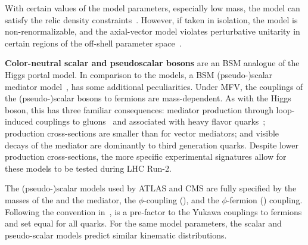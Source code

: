 With certain values of the model parameters, especially low \Zprime mass,
the model can satisfy the relic density constraints~\cite{Chala:2015ama}.
However, if taken in isolation, the model is non-renormalizable, and the axial-vector
model violates perturbative unitarity in certain regions of the off-shell parameter space~\cite{Chala:2015ama,Kahlhoefer:2015bea,Boveia:2016mrp}. 



\textbf{Color-neutral scalar and pseudoscalar bosons} are an BSM analogue of the Higgs portal model. In comparison to the \Zprime models, a BSM (pseudo-)scalar mediator model~\cite{Buckley:2014fba},  
has some additional peculiarities. 
Under MFV, the couplings of the (pseudo-)scalar bosons to fermions are mass-dependent. As with the Higgs boson, this has three familiar consequences: mediator production through loop-induced couplings to gluons~\cite{Haisch:2015ioa} and associated with heavy flavor quarks~\cite{Buckley:2014fba};
    production cross-sections are smaller than for vector mediators;
    and visible decays of the mediator are dominantly to third generation quarks. 
Despite lower production cross-sections, the more specific experimental signatures allow for these models to be tested during LHC Run-2.

The (pseudo-)scalar models used by ATLAS and CMS are fully specified by the masses of the \IP and the mediator, the $\phi$-\IP coupling (\gdm), and the $\phi$-fermion (\gq) coupling.
Following the convention in~\cite{Abercrombie:2015wmb}, \gq is a pre-factor to the Yukawa couplings to fermions and set equal for all quarks.
For the same model parameters, the scalar and pseudo-scalar models predict similar kinematic distributions.

